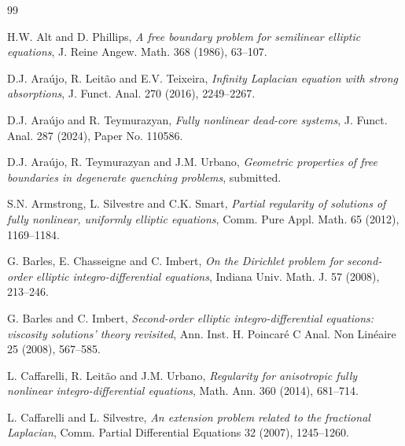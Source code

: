 \documentclass[11pt,reqno]{amsart}
\numberwithin{equation}{section}
\numberwithin{theorem}{section}
\numberwithin{lemma}{section}
\numberwithin{corollary}{section}
\numberwithin{remark}{section}
\numberwithin{proposition}{section}
\numberwithin{definition}{section}
\begin{document}
\bigskip


\smallskip

\begin{thebibliography}{99}

 H.W. Alt and D. Phillips, 
\textit{A free boundary problem for semilinear elliptic equations}, 
J. Reine Angew. Math. 368 (1986), 63--107.

 D.J. Ara\'ujo, R. Leit\~ao and E.V. Teixeira, 
\textit{Infinity Laplacian equation with strong absorptions}, 
J. Funct. Anal. 270 (2016), 2249--2267.

 D.J. Ara\'ujo and R. Teymurazyan, 
\textit{Fully nonlinear dead-core systems}, 
J. Funct. Anal. 287 (2024), Paper No. 110586.

 D.J. Ara\'ujo, R. Teymurazyan and J.M. Urbano, 
\textit{Geometric properties of free boundaries in degenerate quenching problems}, 
submitted.

 S.N. Armstrong, L. Silvestre and C.K. Smart, 
\textit{Partial regularity of solutions of fully nonlinear, uniformly elliptic equations}, 
Comm. Pure Appl. Math. 65 (2012), 1169--1184.

 G. Barles, E. Chasseigne and C. Imbert, 
\textit{On the Dirichlet problem for second-order elliptic integro-differential equations}, 
Indiana Univ. Math. J. 57 (2008), 213--246.

 G. Barles and C. Imbert, 
\textit{Second-order elliptic integro-differential equations: viscosity solutions' theory revisited}, 
Ann. Inst. H. Poincar\'e C Anal. Non Lin\'eaire 25 (2008), 567--585.

 L. Caffarelli, R. Leit\~ao and J.M. Urbano, 
\textit{Regularity for anisotropic fully nonlinear integro-differential equations}, 
Math. Ann. 360 (2014), 681--714.

 L. Caffarelli and L. Silvestre, 
\textit{An extension problem related to the fractional Laplacian}, 
Comm. Partial Differential Equations 32 (2007), 1245--1260.


\end{thebibliography}
\end{document}
